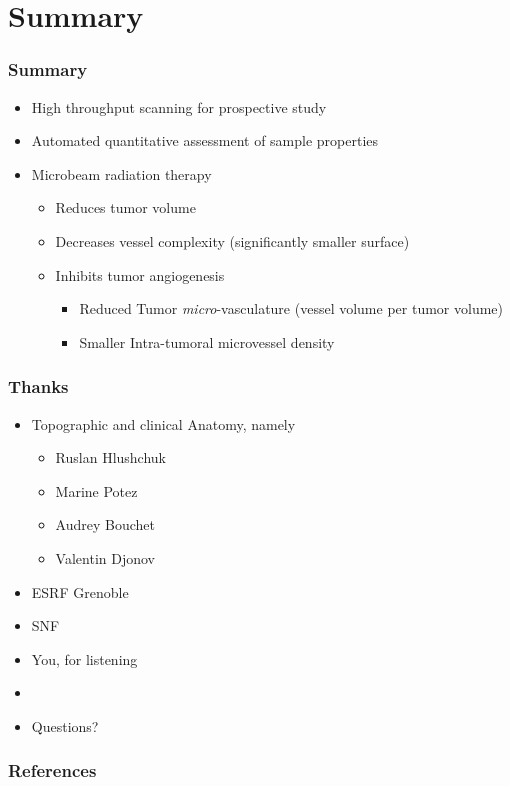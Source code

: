 \documentclass[draft]{beamer}
\begin{document}
\section{Summary}
\begin{frame}
	\frametitle{Summary}
	\begin{itemize}
		\item High throughput scanning for prospective study
		\item Automated quantitative assessment of sample properties
		\item Microbeam radiation therapy
		\begin{itemize}
			\item Reduces tumor volume
			\item Decreases vessel complexity (significantly smaller surface)
			\item Inhibits tumor angiogenesis
			\begin{itemize}
				\item Reduced Tumor \emph{micro}-vasculature (vessel volume per tumor volume)
				\item Smaller Intra-tumoral microvessel density
			\end{itemize}
		\end{itemize}		
	\end{itemize}
\end{frame}

\begin{frame}
	\frametitle{Thanks}
	\begin{itemize}
		\item Topographic and clinical Anatomy, namely
		\begin{itemize}
			\item Ruslan Hlushchuk
			\item Marine Potez
			\item Audrey Bouchet
			\item Valentin Djonov
		\end{itemize}
		\item ESRF Grenoble
		\item SNF
		\pause
		\item You, for listening
		\item[]
		\pause
		\item Questions?
	\end{itemize}
\end{frame}

\begin{frame}
	\frametitle{References}
	\renewcommand*{\bibfont}{\tiny}
	\printbibliography
\end{frame}
\end{document}
